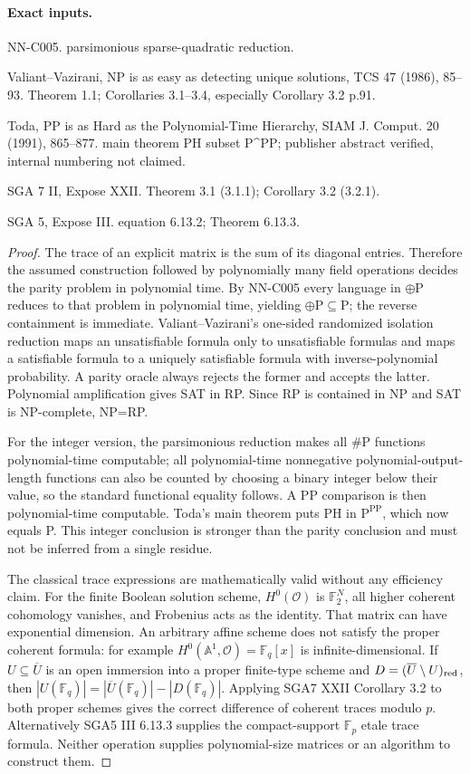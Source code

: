 \paragraph{Exact inputs.}
NN-C005. parsimonious sparse-quadratic reduction.

Valiant--Vazirani, NP is as easy as detecting unique solutions, TCS 47 (1986), 85--93. Theorem 1.1; Corollaries 3.1--3.4, especially Corollary 3.2 p.91.

Toda, PP is as Hard as the Polynomial-Time Hierarchy, SIAM J. Comput. 20 (1991), 865--877. main theorem PH subset P\textasciicircum{}PP; publisher abstract verified, internal numbering not claimed.

SGA 7 II, Expose XXII. Theorem 3.1 (3.1.1); Corollary 3.2 (3.2.1).

SGA 5, Expose III. equation 6.13.2; Theorem 6.13.3.

\begin{proof}
The trace of an explicit matrix is the sum of its diagonal entries. Therefore the assumed construction followed by polynomially many field operations decides the parity problem in polynomial time. By NN-C005 every language in $\oplus\mathrm P$ reduces to that problem in polynomial time, yielding $\oplus\mathrm P\subseteq\mathrm P$; the reverse containment is immediate. Valiant--Vazirani's one-sided randomized isolation reduction maps an unsatisfiable formula only to unsatisfiable formulas and maps a satisfiable formula to a uniquely satisfiable formula with inverse-polynomial probability. A parity oracle always rejects the former and accepts the latter. Polynomial amplification gives SAT in RP. Since RP is contained in NP and SAT is NP-complete, NP=RP.

For the integer version, the parsimonious reduction makes all $\#\mathrm P$ functions polynomial-time computable; all polynomial-time nonnegative polynomial-output-length functions can also be counted by choosing a binary integer below their value, so the standard functional equality follows. A PP comparison is then polynomial-time computable. Toda's main theorem puts PH in $\mathrm P^{\mathrm{PP}}$, which now equals P. This integer conclusion is stronger than the parity conclusion and must not be inferred from a single residue.

The classical trace expressions are mathematically valid without any efficiency claim. For the finite Boolean solution scheme, $H^0(\mathcal O)$ is $\mathbb F_2^N$, all higher coherent cohomology vanishes, and Frobenius acts as the identity. That matrix can have exponential dimension. An arbitrary affine scheme does not satisfy the proper coherent formula: for example $H^0(\mathbb A^1,\mathcal O)=\mathbb F_q[x]$ is infinite-dimensional. If $U\subseteq\overline U$ is an open immersion into a proper finite-type scheme and $D=(\overline U\setminus U)_{\rm red}$, then $|U(\mathbb F_q)|=|\overline U(\mathbb F_q)|-|D(\mathbb F_q)|$. Applying SGA7 XXII Corollary 3.2 to both proper schemes gives the correct difference of coherent traces modulo $p$. Alternatively SGA5 III 6.13.3 supplies the compact-support $\mathbb F_p$ etale trace formula. Neither operation supplies polynomial-size matrices or an algorithm to construct them.
\end{proof}
